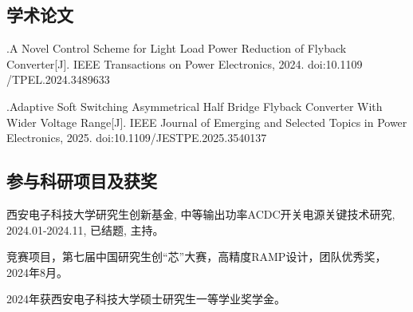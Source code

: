 \subsection{学术论文}
\begin{resresult}
	\item {}.A Novel Control Scheme for Light Load Power Reduction of Flyback Converter[J]. IEEE Transactions on Power Electronics, 2024. doi:10.1109\\/TPEL.2024.3489633
	\item {}.Adaptive Soft Switching Asymmetrical Half Bridge Flyback Converter With Wider Voltage Range[J]. IEEE Journal of Emerging and Selected Topics in Power Electronics, 2025. doi:10.1109/JESTPE.2025.3540137
\end{resresult}


\subsection{参与科研项目及获奖}
\begin{resresult}
	\item 西安电子科技大学研究生创新基金, 中等输出功率ACDC开关电源关键技术研究, 2024.01-2024.11, 已结题, 主持。
	\item 竞赛项目，第七届中国研究生创“芯”大赛，高精度RAMP设计，团队优秀奖，2024年8月。
	\item 2024年获西安电子科技大学硕士研究生一等学业奖学金。
\end{resresult}
